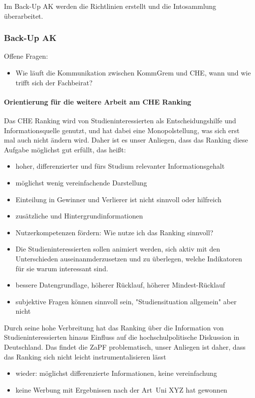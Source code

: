       Im Back-Up AK werden die Richtlinien erstellt und die Intosammlung überarbeitet.

    \subsubsection*{Back-Up AK}
    Offene Fragen:
    \begin{itemize}
      \item Wie läuft die Kommunikation zwischen KommGrem und CHE, wann und wie trifft sich der Fachbeirat?
    \end{itemize}

    \paragraph{Orientierung für die weitere Arbeit am CHE Ranking}

      Das CHE Ranking wird von Studieninteressierten als Entscheidungshilfe und Informationsquelle genutzt, und hat dabei eine Monopolstellung, was sich erst mal auch nicht ändern wird. Daher ist es unser Anliegen, dass das Ranking diese Aufgabe möglichst gut erfüllt, das heißt:
      \begin{itemize}
        \item hoher, differenzierter und fürs Studium relevanter Informationsgehalt
        \item möglichst wenig vereinfachende Darstellung
        \item Einteilung in Gewinner und Verlierer ist nicht sinnvoll oder hilfreich
        \item zusätzliche und Hintergrundinformationen
        \item Nutzerkompetenzen fördern: Wie nutze ich das Ranking sinnvoll?
        \item Die Studieninteressierten sollen animiert werden, sich aktiv mit den Unterschieden auseinanmderzusetzen und zu überlegen, welche Indikatoren für sie warum interessant sind.
        \item bessere Datengrundlage, höherer Rücklauf, höherer Mindest-Rücklauf
        \item subjektive Fragen können sinnvoll sein, "Studiensituation allgemein" aber nicht
      \end{itemize}

      Durch seine hohe Verbreitung hat das Ranking über die Information von Studieninteressierten hinaus Einfluss auf die hochschulpolitische Diskussion in Deutschland. Das findet die ZaPF problematisch, unser Anliegen ist daher, dass das Ranking sich nicht leicht instrumentalisieren lässt
      \begin{itemize}
        \item wieder: möglichst differenzierte Informationen, keine vereinfachung
        \item keine Werbung mit Ergebnissen nach der Art \glqq\,Uni XYZ hat gewonnen\grqq
      \end{itemize}

